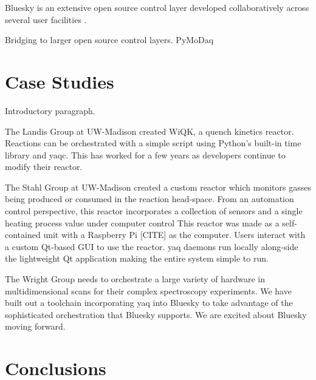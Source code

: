 \documentclass{article}
\begin{document}
Bluesky is an extensive open source control layer developed collaboratively across several user facilities \cite{AllanDanielB2019a}.

Bridging to larger open source control layers.
PyMoDaq \cite{WeberSebastien2021a}

\section{Case Studies}

Introductory paragraph.

The Landis Group at UW-Madison created WiQK, a quench kinetics reactor.
Reactions can be orchestrated with a simple script using Python's built-in time library and yaqc.
This has worked for a few years as developers continue to modify their reactor.

The Stahl Group at UW-Madison created a custom reactor which monitors gasses being produced or consumed in the reaction head-space.  \cite{SalazarChaseA2021a}
From an automation control perspective, this reactor incorporates a collection of sensors and a single heating process value under computer control
This reactor was made as a self-contained unit with a Raspberry Pi [CITE] as the computer.
Users interact with a custom Qt-based GUI to use the reactor.
yaq daemons run locally along-side the lightweight Qt application making the entire system simple to run.

The Wright Group needs to orchestrate a large variety of hardware in multidimensional scans for their complex spectroscopy experiments.
We have built out a toolchain incorporating yaq into Bluesky to take advantage of the sophisticated orchestration that Bluesky supports.
We are excited about Bluesky moving forward.

\section{Conclusions}

\clearpage


\end{document}
